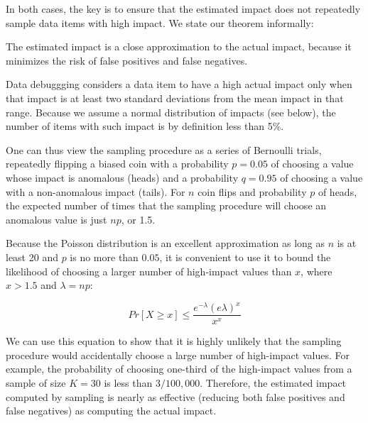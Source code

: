 In both cases, the key is to ensure that the estimated impact does not
repeatedly sample data items with high impact. We state our theorem informally:

\begin{theorem}
The estimated impact is a close approximation to the actual impact, because it minimizes the risk of false positives and false negatives.
\end{theorem}

Data debuggging considers a data item to have a high actual impact
only when that impact is at least two standard deviations from the
mean impact in that range. Because we assume a normal distribution of
impacts (see below), the number of items with such impact is by
definition less than 5\%.

One can thus view the sampling procedure as a series of Bernoulli
trials, repeatedly flipping a biased coin with a probability $p =
0.05$ of choosing a value whose impact is anomalous (heads) and a
probability $q = 0.95$ of choosing a value with a non-anomalous impact
(tails). For $n$ coin flips and probability $p$ of heads, the expected
number of times that the sampling procedure will choose an anomalous
value is just $np$, or 1.5.

Because the Poisson distribution is an excellent approximation as long
as $n$ is at least 20 and $p$ is no more than $0.05$, it is convenient
to use it to bound the likelihood of choosing a larger number of
high-impact values than $x$, where $x > 1.5$ and $\lambda = np$:

\begin{equation}
Pr[X \geq x] \leq \frac{e^{-\lambda}(e \lambda)^x}{x^x}
\end{equation}

We can use this equation to show that it is highly unlikely that the
sampling procedure would accidentally choose a large number of
high-impact values. For example, the probability of choosing one-third
of the high-impact values from a sample of size $K = 30$ is less than
$3/100,000$. Therefore, the estimated impact computed by sampling is
nearly as effective (reducing both false positives and false
negatives) as computing the actual impact.


